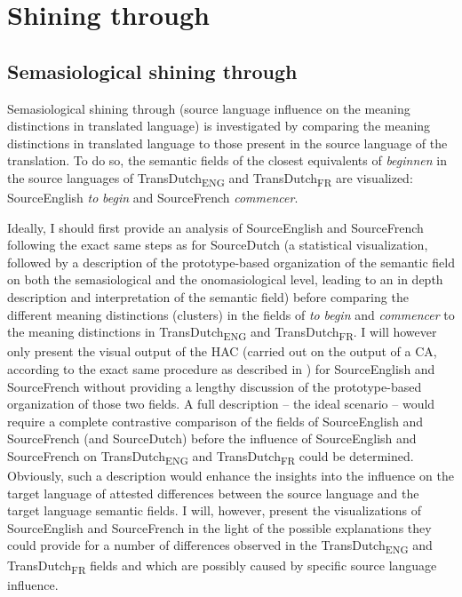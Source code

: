 \section{Shining through}
\label{sec:4.6}  
\subsection{Semasiological shining through}
\label{sec:4.6.1}  
Semasiological shining through (source language influence on the meaning distinctions in translated language) is investigated by comparing the meaning distinctions in translated language to those present in the source language of the translation. To do so, the semantic fields of the closest equivalents of \textit{beginnen} in the source languages of TransDutch\textsubscript{ENG} and TransDutch\textsubscript{FR} are visualized: SourceEnglish \textit{to} \textit{begin} and SourceFrench \textit{commencer}.

Ideally, I should first provide an analysis of SourceEnglish and SourceFrench following the exact same steps as for SourceDutch (a statistical visualization, followed by a description of the prototype-based organization of the semantic field on both the semasiological and the onomasiological level, leading to an in depth description and interpretation of the semantic field) before comparing the different meaning distinctions (clusters) in the fields of \textit{to} \textit{begin} and \textit{commencer} to the meaning distinctions in TransDutch\textsubscript{ENG} and TransDutch\textsubscript{FR}. I will however only present the visual output of the HAC (carried out on the output of a CA, according to the exact same procedure as described in ) for SourceEnglish and SourceFrench without providing a lengthy discussion of the prototype-based organization of those two fields. A full description – the ideal scenario – would require a complete contrastive comparison of the fields of SourceEnglish and SourceFrench (and SourceDutch) before the influence of SourceEnglish and SourceFrench on TransDutch\textsubscript{ENG} and TransDutch\textsubscript{FR} could be determined. Obviously, such a description would enhance the insights into the influence on the target language of attested differences between the source language and the target language semantic fields. I will, however, present the visualizations of SourceEnglish and SourceFrench in the light of the possible explanations they could provide for a number of differences observed in the TransDutch\textsubscript{ENG} and TransDutch\textsubscript{FR} fields and which are possibly caused by specific source language influence.

